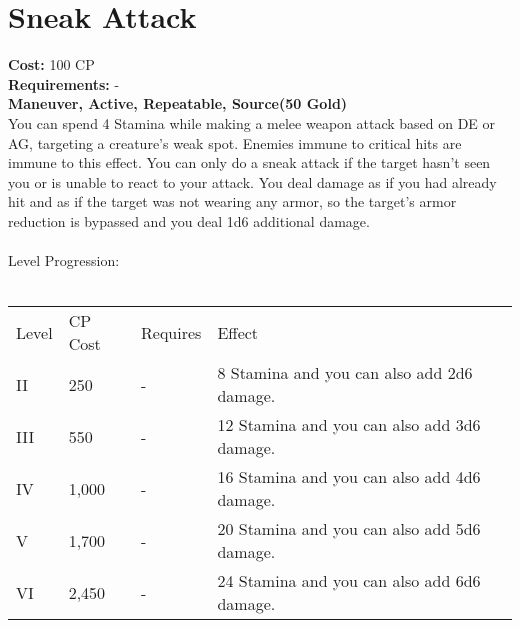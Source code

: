 \section{Sneak Attack}\label{maneuver:sneakAttack}
\textbf{Cost:} 100 CP\\
\textbf{Requirements:} -\\
\textbf{Maneuver, Active, Repeatable, Source(50 Gold)}\\
You can spend 4 Stamina while making a melee weapon attack based on DE or AG, targeting a creature's weak spot.
Enemies immune to critical hits are immune to this effect.
You can only do a sneak attack if the target hasn't seen you or is unable to react to your attack.
You deal damage as if you had already hit and as if the target was not wearing any armor, so the target's armor reduction is bypassed and you deal 1d6 additional damage.\\
\\
Level Progression:\\
\\
\begin{tabular}{l | l | l | l}
	Level & CP Cost & Requires & Effect\\
	II & 250 & - & 8 Stamina and you can also add 2d6 damage.\\
	III & 550 & - &  12 Stamina and you can also add 3d6 damage.\\
	IV & 1,000 & - &  16 Stamina and you can also add 4d6 damage.\\
	V & 1,700 & - &  20 Stamina and you can also add 5d6 damage.\\
	VI & 2,450 & - &  24 Stamina and you can also add 6d6 damage.\\
\end{tabular}